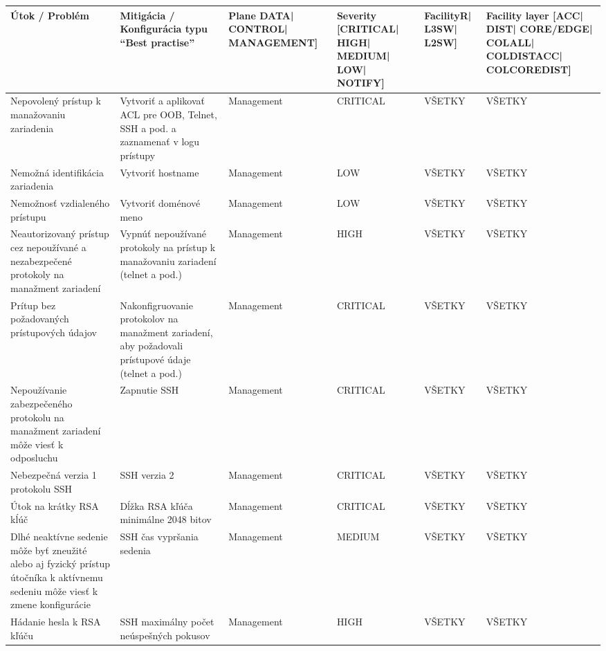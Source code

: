 \scriptsize
\begin{longtable}{|P{8em}|P{9em}|P{8em}|P{5em}|P{5em}|P{10em}|}
	\captionsetup{font=normalsize}
    \hline
    Útok / Problém & Mitigácia / Konfigurácia typu “Best practise” & Plane \hspace{2em}{[}DATA| CONTROL| \hbox{MANAGEMENT}{]} & Severity {[}\hbox{CRITICAL}| HIGH| MEDIUM| LOW| NOTIFY{]}\cite{McMillan2018} & Facility\hspace{1em}{[}R| L3SW| L2SW{]} & Facility layer \hspace{2em} {[}ACC| DIST| \hbox{CORE/EDGE}| COLALL| \hbox{COLDISTACC}| \hbox{COLCOREDIST}{]} \\ \hline
    \endhead
    Nepovolený prístup k manažovaniu zariadenia & Vytvoriť a aplikovať ACL pre OOB, Telnet, SSH a pod. a zaznamenať v logu prístupy & Management & CRITICAL & VŠETKY & VŠETKY \\ \hline
    Nemožná identifikácia zariadenia & Vytvoriť hostname & Management & LOW & VŠETKY & VŠETKY \\ \hline
    Nemožnosť vzdialeného prístupu & Vytvoriť doménové meno & Management & LOW & VŠETKY & VŠETKY \\ \hline
    Neautorizovaný prístup cez nepoužívané a nezabezpečené protokoly na manažment zariadení & Vypnúť nepoužívané protokoly na prístup k manažovaniu zariadení (telnet a pod.) & Management & HIGH & VŠETKY & VŠETKY \\ \hline
    Prítup bez požadovaných prístupových údajov & Nakonfigruovanie protokolov na manažment zariadení, aby požadovali prístupové údaje (telnet a pod.) & Management & CRITICAL & VŠETKY & VŠETKY \\ \hline
    Nepoužívanie zabezpečeného protokolu na manažment zariadení môže viesť k odposluchu & Zapnutie SSH & Management & CRITICAL & VŠETKY & VŠETKY \\ \hline
    Nebezpečná verzia 1 protokolu SSH & SSH verzia 2 & Management & CRITICAL & VŠETKY & VŠETKY \\ \hline
    Útok na krátky RSA kĺúč & Dĺžka RSA kľúča minimálne 2048 bitov & Management & CRITICAL & VŠETKY & VŠETKY \\ \hline
    Dlhé neaktívne sedenie môže byť zneužité alebo aj fyzický prístup útočníka k aktívnemu sedeniu môže viesť k zmene konfigurácie & SSH čas vypršania sedenia & Management & MEDIUM & VŠETKY & VŠETKY \\ \hline
    Hádanie hesla k RSA kľúču & SSH maximálny počet neúspešných pokusov & Management & HIGH & VŠETKY & VŠETKY \\ \hline

\end{longtable}
